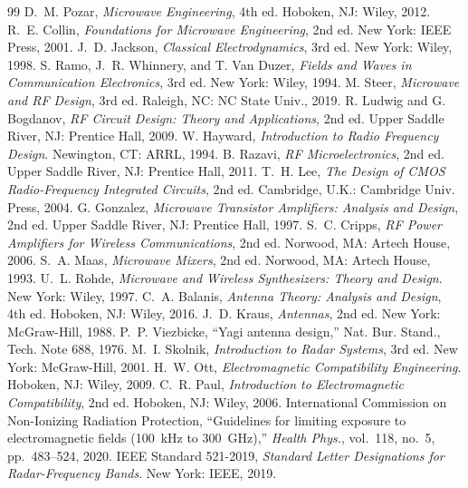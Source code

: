 \begin{thebibliography}{99}
 D.~M. Pozar, \emph{Microwave Engineering}, 4th ed. Hoboken, NJ: Wiley, 2012.
 R.~E. Collin, \emph{Foundations for Microwave Engineering}, 2nd ed. New York: IEEE Press, 2001.
 J.~D. Jackson, \emph{Classical Electrodynamics}, 3rd ed. New York: Wiley, 1998.
 S. Ramo, J.~R. Whinnery, and T. Van Duzer, \emph{Fields and Waves in Communication Electronics}, 3rd ed. New York: Wiley, 1994.
 M. Steer, \emph{Microwave and RF Design}, 3rd ed. Raleigh, NC: NC State Univ., 2019.
 R. Ludwig and G. Bogdanov, \emph{RF Circuit Design: Theory and Applications}, 2nd ed. Upper Saddle River, NJ: Prentice Hall, 2009.
 W. Hayward, \emph{Introduction to Radio Frequency Design}. Newington, CT: ARRL, 1994.
 B. Razavi, \emph{RF Microelectronics}, 2nd ed. Upper Saddle River, NJ: Prentice Hall, 2011.
 T.~H. Lee, \emph{The Design of CMOS Radio-Frequency Integrated Circuits}, 2nd ed. Cambridge, U.K.: Cambridge Univ. Press, 2004.
 G. Gonzalez, \emph{Microwave Transistor Amplifiers: Analysis and Design}, 2nd ed. Upper Saddle River, NJ: Prentice Hall, 1997.
 S.~C. Cripps, \emph{RF Power Amplifiers for Wireless Communications}, 2nd ed. Norwood, MA: Artech House, 2006.
 S.~A. Maas, \emph{Microwave Mixers}, 2nd ed. Norwood, MA: Artech House, 1993.
 U.~L. Rohde, \emph{Microwave and Wireless Synthesizers: Theory and Design}. New York: Wiley, 1997.
 C.~A. Balanis, \emph{Antenna Theory: Analysis and Design}, 4th ed. Hoboken, NJ: Wiley, 2016.
 J.~D. Kraus, \emph{Antennas}, 2nd ed. New York: McGraw-Hill, 1988.
 P.~P. Viezbicke, ``Yagi antenna design,'' Nat. Bur. Stand., Tech. Note 688, 1976.
 M.~I. Skolnik, \emph{Introduction to Radar Systems}, 3rd ed. New York: McGraw-Hill, 2001.
 H.~W. Ott, \emph{Electromagnetic Compatibility Engineering}. Hoboken, NJ: Wiley, 2009.
 C.~R. Paul, \emph{Introduction to Electromagnetic Compatibility}, 2nd ed. Hoboken, NJ: Wiley, 2006.
 International Commission on Non-Ionizing Radiation Protection, ``Guidelines for limiting exposure to electromagnetic fields (100~kHz to 300~GHz),'' \emph{Health Phys.}, vol.~118, no.~5, pp.~483--524, 2020.
 IEEE Standard 521-2019, \emph{Standard Letter Designations for Radar-Frequency Bands}. New York: IEEE, 2019.

\end{thebibliography}
